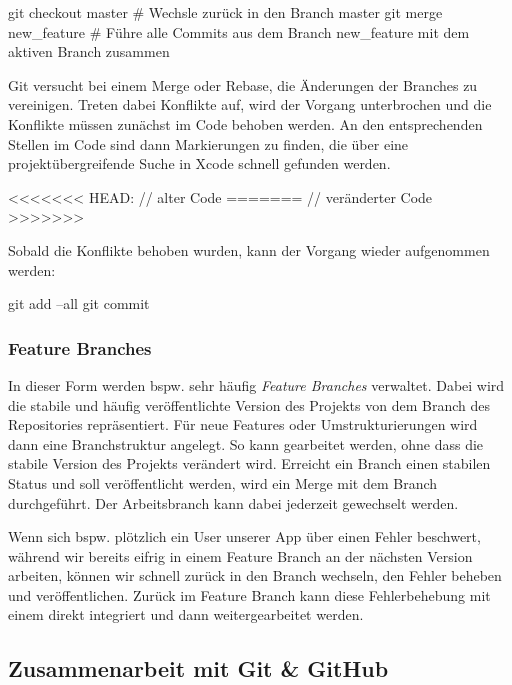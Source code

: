 \documentclass[parskip=half, final]{scrreprt}
\begin{document}
\begin{shcode}
git checkout master # Wechsle zurück in den Branch master
git merge new_feature # Führe alle Commits aus dem Branch new_feature mit dem aktiven Branch zusammen
\end{shcode}

Git versucht bei einem Merge oder Rebase, die Änderungen der Branches zu vereinigen. Treten dabei Konflikte auf, wird der Vorgang unterbrochen und die Konflikte müssen zunächst im Code behoben werden. An den entsprechenden Stellen im Code sind dann Markierungen zu finden, die über eine projektübergreifende Suche in Xcode schnell gefunden werden.

\begin{objccode}
<<<<<<< HEAD:
// alter Code
=======
// veränderter Code
>>>>>>>
\end{objccode}

Sobald die Konflikte behoben wurden, kann der Vorgang wieder aufgenommen werden:

\begin{shcode}
git add --all
git commit
\end{shcode}

\subsubsection{Feature Branches}

In dieser Form werden bspw. sehr häufig \emph{Feature Branches} verwaltet. Dabei wird die stabile und häufig veröffentlichte Version des Projekts von dem  Branch des Repositories repräsentiert. Für neue Features oder Umstrukturierungen wird dann eine Branchstruktur angelegt. So kann gearbeitet werden, ohne dass die stabile Version des Projekts verändert wird. Erreicht ein Branch einen stabilen Status und soll veröffentlicht werden, wird ein Merge mit dem  Branch durchgeführt. Der Arbeitsbranch kann dabei jederzeit gewechselt werden.

Wenn sich bspw. plötzlich ein User unserer App über einen Fehler beschwert, während wir bereits eifrig in einem Feature Branch an der nächsten Version arbeiten, können wir schnell zurück in den  Branch wechseln, den Fehler beheben und veröffentlichen. Zurück im Feature Branch kann diese Fehlerbehebung mit einem  direkt integriert und dann weitergearbeitet werden.

\subsection{Zusammenarbeit mit Git \& GitHub}
\end{document}
